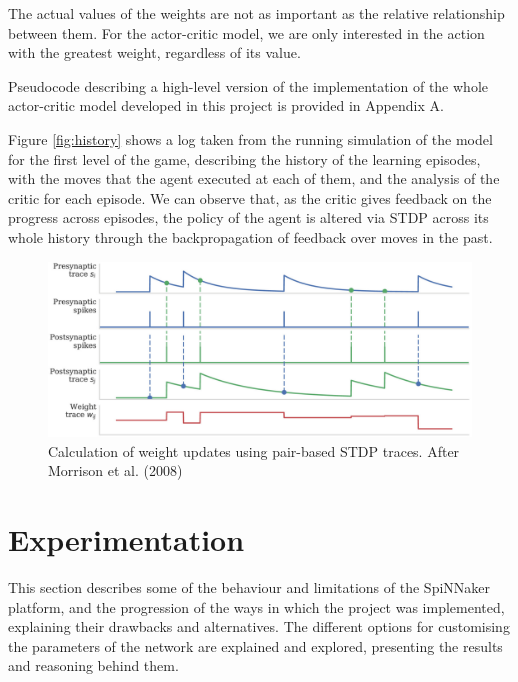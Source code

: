 \documentclass[10pt]{article}
\begin{document}
    The actual values of the weights are not as important as the relative relationship between them. For the actor-critic model, we are only interested in the action with the greatest weight, regardless of its value.

    Pseudocode describing a high-level version of the implementation of the whole actor-critic model developed in this project is provided in Appendix A.

    Figure \ref{fig:history} shows a log taken from the running simulation of the model for the first level of the game, describing the history of the learning episodes, with the moves that the agent executed at each of them, and the analysis of the critic for each episode. We can observe that, as the critic gives feedback on the progress across episodes, the policy of the agent is altered via STDP across its whole history through the backpropagation of feedback over moves in the past.
    
    \begin{figure}[b]
    \center
    \includegraphics[width=155mm]{./spikeTraces.png}
    \caption{Calculation of weight updates using pair-based STDP traces. After Morrison et al. (2008)}
    \label{fig:spikeTraces}
    \end{figure}

    \section{Experimentation}

    This section describes some of the behaviour and limitations of the SpiNNaker platform, and the progression of the ways in which the project was implemented, explaining their drawbacks and alternatives. The different options for customising the parameters of the network are explained and explored, presenting the results and reasoning behind them.
\end{document}
